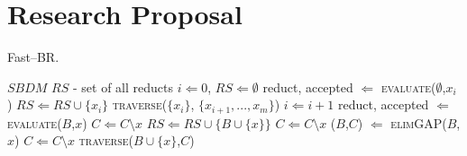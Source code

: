 \documentclass[citenumber]{elsarticle}
\renewcommand{\algorithmicrequire}{\textbf{Input:}}
\renewcommand{\algorithmicensure}{\textbf{Output:}}
\begin{document}
\section{Research Proposal}  
%    
	\renewcommand{\algorithmicrequire}{\textbf{Input:}}
	\renewcommand{\algorithmicensure}{\textbf{Output:}}
	\begin{algorithm}
		\caption{Fast--BR.}
		\label{alg:RSDM}
		\begin{algorithmic}[1]
			\Require $SBDM$
			\Ensure $RS$ - set of all reducts
			\State $i \Leftarrow 0$, $RS \Leftarrow \emptyset$
				\State reduct, accepted $\Leftarrow$ \textsc{evaluate}($\emptyset$,$x_i$)
					\State $RS \Leftarrow RS\cup\lbrace x_i \rbrace$
				\Else
					\State \textsc{traverse}($\lbrace x_i \rbrace$, $\lbrace x_{i+1},..., x_m\rbrace$)
				\EndIf
				\State $i \Leftarrow i+1$
			\EndWhile
				\State reduct, accepted $\Leftarrow$ \textsc{evaluate}($B$,$x$)
					\State $C \Leftarrow C\setminus x$
					\State $RS \Leftarrow RS\cup\lbrace B\cup \lbrace x\rbrace \rbrace$
				\Else
						\State $C \Leftarrow C\setminus x$
					\EndIf
				\EndIf
			\EndFor
				\State ($B$,$C$) $\Leftarrow$ \textsc{elimGAP}($B$,$x$)
			\EndIf
				\State $C \Leftarrow C\setminus x$
				\State \textsc{traverse}($B\cup \lbrace x\rbrace$,$C$)
			\EndFor
			\EndProcedure
		\end{algorithmic}
	\end{algorithm}    
	
\end{document}
